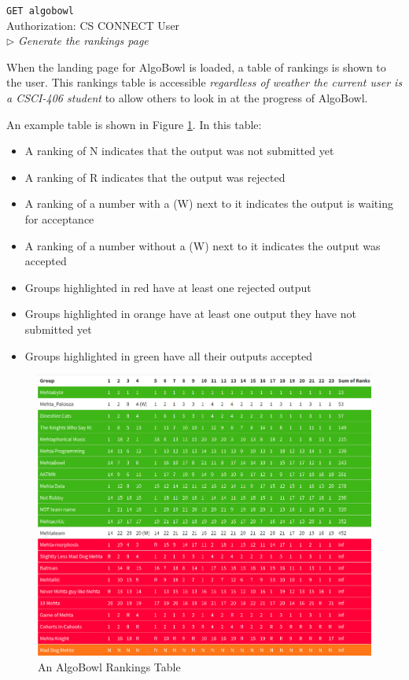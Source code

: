 \documentclass[12pt]{article}
\newcommand\ctrltitle[1]{\par\medskip\texttt{\large #1}\\}
\newcommand\ctrlauth[1]{Authorization: #1\\}
\newcommand\ctrldesc[1]{$\rhd$ \textsl{#1}\par\medskip}
\begin{document}
\ctrltitle{GET algobowl}
\ctrlauth{CS CONNECT User}
\ctrldesc{Generate the rankings page}

When the landing page for AlgoBowl is loaded, a table of rankings is shown to
the user. This rankings table is accessible \emph{regardless of weather the
current user is a CSCI-406 student} to allow others to look in at the progress
of AlgoBowl.

An example table is shown in Figure \ref{algotbl}. In this table:
\begin{itemize}
    \item A ranking of \textsf{N} indicates that the output was not submitted yet
    \item A ranking of \textsf{R} indicates that the output was rejected
    \item A ranking of a number with a \textsf{(W)} next to it indicates the output is waiting for acceptance
    \item A ranking of a number without a \textsf{(W)} next to it indicates the output was accepted
    \item Groups highlighted in red have at least one rejected output
    \item Groups highlighted in orange have at least one output they have not submitted yet
    \item Groups highlighted in green have all their outputs accepted
\end{itemize}

\begin{figure}
    \includegraphics[width=\textwidth]{graphics/algotbl}
    \caption{An AlgoBowl Rankings Table}
    \label{algotbl}
\end{figure}
\end{document}
